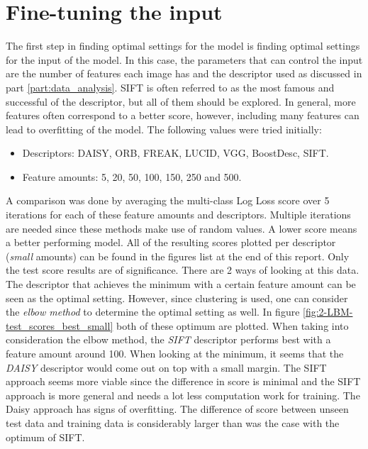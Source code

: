 
\section{Fine-tuning the input}
\label{section:LBM_finetuning_features}
The first step in finding optimal settings for the model is finding optimal settings for the input of the model.
In this case, the parameters that can control the input are the number of features each image has and the descriptor used as discussed in part \ref{part:data_analysis}.
SIFT is often referred to as the most famous and successful of the descriptor, but all of them should be explored.
In general, more features often correspond to a better score, however, including many features can lead to overfitting of the model.
The following values were tried initially:
\begin{itemize}
    \item Descriptors: DAISY, ORB, FREAK, LUCID, VGG, BoostDesc, SIFT.
    \item Feature amounts: 5, 20, 50, 100, 150, 250 and 500.
\end{itemize}

A comparison was done by averaging the multi-class Log Loss score over 5 iterations for each of these feature amounts and descriptors.
Multiple iterations are needed since these methods make use of random values.
A lower score means a better performing model.
All of the resulting scores plotted per descriptor (\emph{small} amounts) can be found in the figures list at the end of this report.
Only the test score results are of significance.
There are 2 ways of looking at this data.
The descriptor that achieves the minimum with a certain feature amount can be seen as the optimal setting.
However, since clustering is used, one can consider the \emph{elbow method} to determine the optimal setting as well.
In figure \ref{fig:2-LBM-test_scores_best_small} both of these optimum are plotted.
When taking into consideration the elbow method, the \emph{SIFT} descriptor performs best with a feature amount around 100.
When looking at the minimum, it seems that the \emph{DAISY} descriptor would come out on top with a small margin.
The SIFT approach seems more viable since the difference in score is minimal and the SIFT approach is more general and needs a lot less computation work for training.
The Daisy approach has signs of overfitting.
The difference of score between unseen test data and training data is considerably larger than was the case with the optimum of SIFT.

